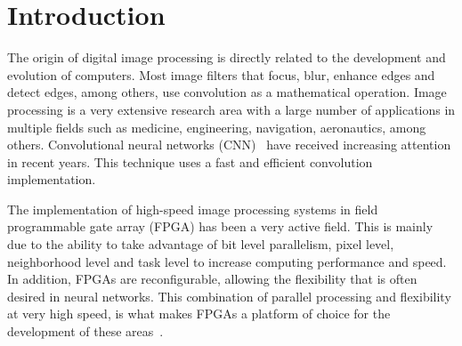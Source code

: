 \documentclass[conference,compsoc]{IEEEtran}
\begin{document}
\section{Introduction}





The origin of digital image processing is directly related to the development and evolution of computers. Most
image filters that focus, blur, enhance edges and detect edges, among
others, use convolution as a mathematical operation. Image processing is a very
extensive research area with a large number of applications in multiple fields
such as medicine, engineering, navigation, aeronautics, among others.
Convolutional neural networks (CNN)~\cite{Lecun-et-al-1998} have received
increasing attention in recent years. This technique uses a fast and efficient
convolution implementation.

The implementation of high-speed image processing systems in field programmable
gate array (FPGA) has been a very active field. This is mainly due to the
ability to take advantage of bit level parallelism, pixel level, neighborhood
level and task level to increase computing performance and speed. In addition, FPGAs are
reconfigurable, allowing the flexibility that is often desired in neural
networks. This combination of parallel processing and flexibility at very high
speed, is what makes FPGAs a platform of choice for the development of these
areas~\cite{papercnn}.
\end{document}
